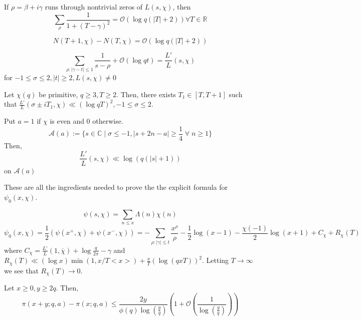\documentclass[oneside, 12pt, ]{scrbook}
\newcommand{\CC}{\mathbb C}
\newcommand{\RR}{\mathbb R}
\theoremstyle{theorem}
\begin{document}
\begin{lemma}
If $\rho = \beta + i \gamma$ runs through nontrivial zeros of $L(s, \chi)$, then $$\sum_{\rho} \frac{1}{1 + (T - \gamma)^2} = \mathcal{O} (\log q(|T| + 2)) \forall T \in \RR $$
\end{lemma}

\begin{lemma}
$$N(T+1, \chi) - N(T , \chi) = \mathcal{O} (\log q (|T| + 2))$$
\end{lemma}

\begin{lemma}
$$\sum_{\rho: |\gamma - t|\le 1} \frac{1}{s - \rho} + \mathcal{O}(\log qt) = \frac{L'}{L}(s,\chi)$$ for $-1 \le \sigma \le 2 , |t|\geq 2, L(s,\chi) \neq 0$
\end{lemma}

\begin{lemma}
Let $\chi(q)$ be primitive, $q \geq 3, T \geq 2$. Then, there exists $T_{1} \in [T,T+1]$ such that $\frac{L'}{L}(\sigma \pm iT_{1}, \chi) \ll (\log qT)^2 , -1 \le \sigma \le 2$.
\end{lemma}

\begin{lemma}
Put $a=1$ if $\chi$ is even and $0$ otherwise. $$\mathcal{A}(a) := \{ s \in \CC \mid \sigma \le -1 , |s + 2n - a| \geq \frac{1}{4} \; \forall \; n \geq 1\}$$ Then, $$\frac{L'}{L} (s, \chi) \ll \log (q(|s|+1))$$ on $\mathcal{A}(a)$
\end{lemma}

These are all the ingredients needed to prove the the explicit formula for $\psi_{0}(x, \chi)$. 

\begin{theorem}
$$\psi(s,\chi) = \sum_{n \le x} \Lambda(n) \chi(n)$$ $$\psi_{0}(x,\chi)  = \frac{1}{2}(\psi(x^{+}, \chi) + \psi(x^{-}, \chi)) = - \sum_{\rho : |\gamma|\le t} \frac{x^{\rho}}{\rho} - \frac{1}{2} \log (x-1) - \frac{\chi(-1)}{2} \log (x+1) + C_{\chi} + R_{\chi}(T)$$ where $C_{\chi} = \frac{L'}{L} (1, \overline{\chi}) + \log \frac{q}{2 \pi} - \gamma$ and $R_{\chi}(T) \ll (\log x)\min(1, x/T <x>) + \frac{x}{T} (\log (qxT))^2$. Letting $T \rightarrow \infty$ we see that $R_{\chi}(T) \rightarrow 0$.
\end{theorem}

\begin{theorem}
Let $x\geq 0, y \geq 2q$. Then, $$\pi(x+y; q,a) - \pi (x; q,a) \le \frac{2y}{\phi(q) \log (\frac{y}{q})} \left( 1 + \mathcal{O}(\frac{1}{\log (\frac{y}{q})}) \right)$$
\end{theorem}
\end{document}
